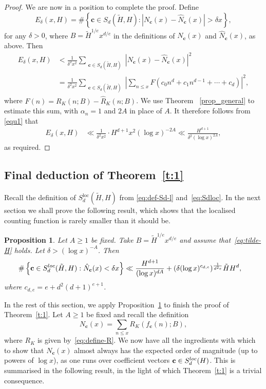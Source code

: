 \documentclass[11pt,letterpaper]{amsart}
\renewcommand{\leq}{\leqslant}
\renewcommand{\geq}{\geqslant}
\newtheorem{proposition}[theorem]{Proposition}
\theoremstyle{definition}
\numberwithin{equation}{section}
\renewcommand{\c}{\mathbf{c}}
\newcommand{\0}{\mathbf{0}}
\begin{document}
\begin{proof}
We are now in a position to complete the proof.
Define
$$
E_\delta(x,H)=\#\left\{ \c\in S_d(\tilde H, H): |N_\c(x)-\hat N_\c(x)|>\delta x\right\} ,
$$
for any  $\delta>0$,  where 
$B=\tilde H^{1/e}x^{d/e}$ in the definitions of $N_\c(x)$ and $\hat N_\c(x)$, as above.
Then
\begin{align*}
E_\delta(x,H) &<
\frac{1}{\delta^2 x^2} \sum_{\substack{\c\in S_d(\tilde H, H)}} |N_\c(x)-\hat N_\c(x)|^2 \\
&=  \frac{1}{\delta^2 x^2} 
\sum_{\substack{\c\in S_d(\tilde H, H)}}\left|\sum_{n\leq x} F(c_0n^d+c_1n^{d-1}+\cdots+c_d)\right|^2,
\end{align*}
where 
$F(n)= R_K(n;B)-\hat R_K(n;B)$. 
We use Theorem 
~\ref{prop_general} 
to estimate this sum, with $\alpha_n=1$ and $2A$ in place of $A$. It therefore follows from  
\eqref{equ1} that 
\begin{align*}
E_\delta(x,H) 
&\ll 
\frac{1}{\delta^2 x^2} \cdot  H^{d+1} x^2 (\log x)^{-2A}\ll 
\frac{ H^{d+1}}{\delta^2  (\log x)^{2A}},
\end{align*}
as required.
\end{proof}



\subsection{Final deduction of Theorem~\ref{t:1}}


Recall the definition of 
$S_d^{\text{loc}}(\tilde H, H)$ from 
\eqref{eq:def-Sd-l} and~\eqref{eq:Sdloc}.
In the next section we shall prove the following result, which shows that the localised counting function is rarely smaller than it should be.


\begin{proposition}\label{p:STEP2'}
Let $A\geq 1$ be fixed. Take $B=\tilde H^{1/e}x^{d/e}$ and assume that~\eqref{eq:tilde-H} holds.
Let $\delta>  (\log x)^{-A}$.
Then 
\begin{align*}
&\#\left\{ \c\in S_d^{\textnormal{loc}}(\tilde H, H): 
\hat N_\c(x) <\delta x\right\} 
 \ll 
 \frac{H^{d+1}}{(\log x)^{dA}}+
 (\delta (\log x)^{c_{d,e}})^{\frac{1}{d^2e}}{\tilde H H^{d}},
\end{align*}
where $c_{d,e}=e+d^2(d+1)^{e+1}$.
\end{proposition}

In the rest of this section, we apply Proposition~\ref{p:STEP2'} to finish the proof of Theorem~\ref{t:1}.
Let $A\geq 1$ be fixed and 
recall the definition
$$
N_{\c}(x)=\sum_{n\leq x}  R_K(f_\c(n);B),
$$
where $R_K$ is given by~\eqref{eq:define-R}.
We now have all the ingredients with which to show that 
$N_{\c}(x)$  almost always has the expected order of magnitude (up to powers of $\log x$), as one runs over coefficient vectors 
$\c\in S_d^{\textnormal{loc}}(H)$. This is summarised in the following result, in the light of 
which  Theorem~\ref{t:1} is a trivial consequence. 
\end{document}
